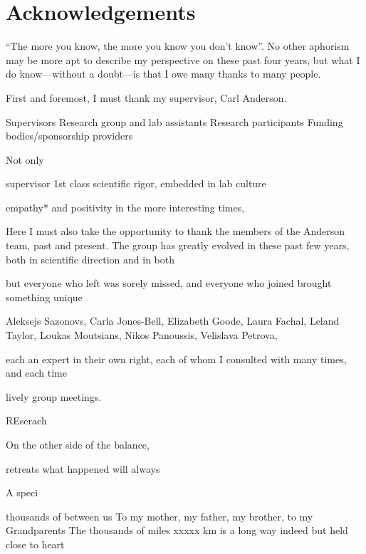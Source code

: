 %
%

\chapter{Acknowledgements}

\enquote{The more you know, the more you know you don't know}.
No other aphorism may be more apt to describe my perspective on these past four years,
but what I do know---without a doubt---is that I owe many thanks to many people.

First and foremost, I must thank my supervisor, Carl Anderson.

Supervisors
Research group and lab assistants
Research participants
Funding bodies/sponsorship providers

Not only 

supervisor
1st class scientific rigor, embedded in lab culture

empathy* and positivity in the more interesting times,

Here I must also take the opportunity to thank the members of the Anderson team, past and present.
The group has greatly evolved in these past few years,
both in scientific direction and in 
both 

but everyone who left was sorely missed,
and everyone who joined brought something unique


Aleksejs Sazonovs,
Carla Jones-Bell,
Elizabeth Goode,
Laura Fachal,
Leland Taylor,
Loukas Moutsians, 
Nikos Panoussis,
Velislava Petrova, 

each an expert in their own right, 
each of whom I consulted with many times,
and each time 


lively group meetings.


REserach


%
%

On the other side of the balance,

retreats
what happened will always  

A speci

%
thousands of  between us
To my mother, my father, my brother, 
to my Grandparents
The thousands of miles
    xxxxx km is a long way indeed
    but held close to heart

